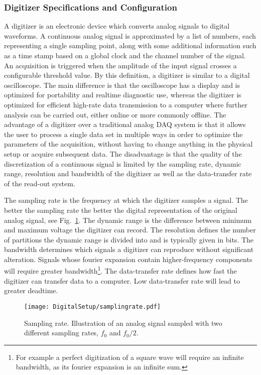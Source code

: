 \documentclass[main.tex]{subfiles}
\begin{document}
\subsubsection{Digitizer Specifications and Configuration}
A digitizer is an electronic device which converts analog signals to digital waveforms. A continuous analog signal is approximated by a list of numbers, each representing a single sampling point, along with some additional information such as a time stamp based on a global clock and the channel number of the signal. An acquisition is triggered when the amplitude of the input signal crosses a configurable threshold value.
By this definition, a digitizer is similar to a digital oscilloscope. The main difference is that the oscilloscope has a display and is optimized for portability and realtime diagnostic use, whereas the digitizer is optimized for efficient high-rate data transmission to a computer where further analysis can be carried out, either online or more commonly offline.
The advantage of a digitizer over a traditional analog DAQ system is that it allows the user to process a single data set in multiple ways in order to optimize the parameters of the acquisition, without having to change anything in the physical setup or acquire subsequent data. The disadvantage is that the quality of the discretization of a continuous signal is limited by the sampling rate, dynamic range, resolution and bandwidth of the digitizer as well as the data-transfer rate of the read-out system.


The sampling rate is the frequency at which the digitizer samples a signal. The better the sampling rate the better the digital representation of the original analog signal, see Fig.~\ref{fig:samplingrate}.
The dynamic range is the difference between minimum and maximum voltage the digitizer can record. The resolution defines the number of partitions the dynamic range is divided into and is typically given in bits. The bandwidth determines which signals a digitizer can reproduce without significant alteration. Signals whose fourier expansion contain higher-frequency components will require greater bandwidth\footnote{For example a perfect digitization of a square wave will require an infinite bandwidth, as its fourier expansion is an infinite sum.}. The data-transfer rate defines how fast the digitizer can transfer data to a computer. Low data-transfer rate will lead to greater deadtime.

\begin{figure}[ht]
	\centering
    	\texttt{[image: DigitalSetup/samplingrate.pdf]}
        \caption[Sampling rate.]{Sampling rate. Illustration of an analog signal sampled with two different sampling rates, $f_0$ and $f_0/2$.}
	    \label{fig:samplingrate} 
\end{figure}
\end{document}
